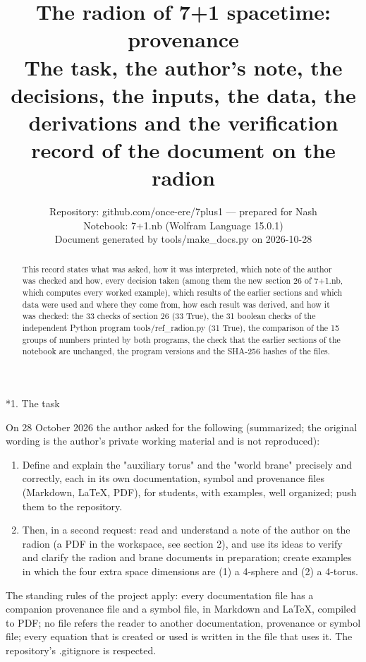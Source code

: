 \documentclass[10pt,a4paper]{article}
\makeatletter
\renewcommand\section{\@startsection{section}{1}{\z@}{-3.5ex \@plus -1ex \@minus -.2ex}{2.3ex \@plus.2ex}{\normalfont\Large\bfseries\raggedright}}
\makeatother
\begin{document}
\title{The radion of 7+1 spacetime: provenance\\[0.4em]\large The task, the author’s note, the decisions, the inputs, the data, the derivations and the verification record of the document on the radion}
\author{Repository: github.com/once-ere/7plus1 — prepared for Nash\\ Notebook: 7+1.nb (Wolfram Language 15.0.1)\\ Document generated by tools/make\_docs.py on 2026-10-28}
\date{}
\maketitle
\begin{abstract}
This record states what was asked, how it was interpreted, which note of the author was checked and how, every decision taken (among them the new section 26 of 7+1.nb, which computes every worked example), which results of the earlier sections and which data were used and where they come from, how each result was derived, and how it was checked: the 33 checks of section 26 (33 True), the 31 boolean checks of the independent Python program tools/ref\_radion.py (31 True), the comparison of the 15 groups of numbers printed by both programs, the check that the earlier sections of the notebook are unchanged, the program versions and the SHA-256 hashes of the files.
\end{abstract}
\tableofcontents
{}\section*{1. The task}
On 28 October 2026 the author asked for the following (summarized; the original wording is the author’s private working material and is not reproduced):

\begin{enumerate}
\item Define and explain the "auxiliary torus" and the "world brane" precisely and correctly, each in its own documentation, symbol and provenance files (Markdown, LaTeX, PDF), for students, with examples, well organized; push them to the repository.
\item Then, in a second request: read and understand a note of the author on the radion (a PDF in the workspace, see section 2), and use its ideas to verify and clarify the radion and brane documents in preparation; create examples in which the four extra space dimensions are (1) a 4-sphere and (2) a 4-torus.
\end{enumerate}
The standing rules of the project apply: every documentation file has a companion provenance file and a symbol file, in Markdown and LaTeX, compiled to PDF; no file refers the reader to another documentation, provenance or symbol file; every equation that is created or used is written in the file that uses it. The repository’s .gitignore is respected.
\end{document}
